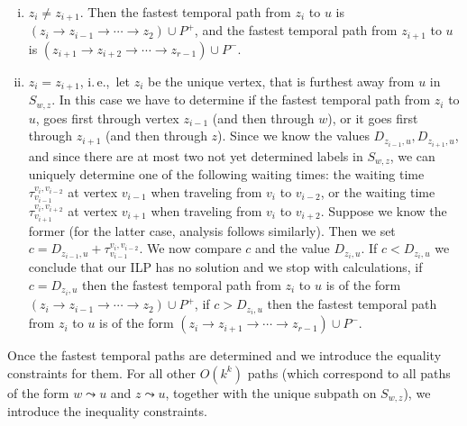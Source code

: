 \documentclass[a4paper,UKenglish,cleveref, autoref, thm-restate, anonymous]{lipics-v2021}
\newcommand{\ie}{i.\,e.,\ }
\begin{document}
\begin{enumerate}[(i)]
    \item \label{FPT:equality-fromUtoX-twosplit}
    $z_i \neq z_{i+1}$.
    Then the fastest temporal path from $z_i$ to $u$ is 
    $(z_i \rightarrow z_{i-1} \rightarrow \cdots \rightarrow z_2) \cup P^+$,
    and 
    the fastest temporal path from $z_{i+1}$ to $u$ is 
    $(z_{i+1} \rightarrow z_{i+2} \rightarrow \cdots \rightarrow z_{r-1}) \cup P^-$.
    \item \label{FPT:equality-fromUtoX-onesplit}
    $z_i = z_{i+1}$, \ie let $z_i$ be the unique vertex, that is furthest away from $u$ in $S_{w,z}$.
    In this case we have to determine if the fastest temporal path from $z_i$ to $u$, goes first through vertex $z_{i-1}$ (and then through $w$),
    or it goes first through $z_{i+1}$ (and then through $z$).
    Since we know the values $D_{z_{i-1},u}, D_{z_{i+1},u}$,
    and since there are at most two not yet determined labels in $S_{w,z}$,
    we can uniquely determine one of the following
    waiting times:
    the waiting time $\tau_{v_{i-1}} ^{v_{i}, v_{i-2}}$ at vertex $v_{i-1}$ when traveling from $v_i$ to $v_{i-2}$,
    or
    the waiting time $\tau_{v_{i+1}} ^{v_{i}, v_{i+2}}$ at vertex $v_{i+1}$ when traveling from $v_i$ to $v_{i+2}$.
    Suppose we know the former (for the latter case, analysis follows similarly).
    Then we set $c = D_{z_{i-1},u} +  \tau_{v_{i-1}} ^{v_{i}, v_{i-2}}$.
    We now compare $c$ and the value $D_{z_{i},u}$.
    If $c < D_{z_{i},u}$ we conclude that our ILP has no solution and we stop with calculations,
    if $c = D_{z_{i},u}$ then the fastest temporal path from $z_i$ to $u$ is of the form $(z_i \rightarrow z_{i-1} \rightarrow \cdots \rightarrow z_2) \cup P^+$,
    if $c > D_{z_{i},u}$ then the fastest temporal path from $z_i$ to $u$ is of the form $(z_i \rightarrow z_{i+1} \rightarrow \cdots \rightarrow z_{r-1}) \cup P^-$.
\end{enumerate}
Once the fastest temporal paths are determined and we introduce the equality constraints for them.
For all other $O(k^k)$ paths (which correspond to all paths of the form $w \leadsto u$ and $z \leadsto u$, together with the unique subpath on $S_{w,z}$),
we introduce the inequality constraints.
\end{document}
